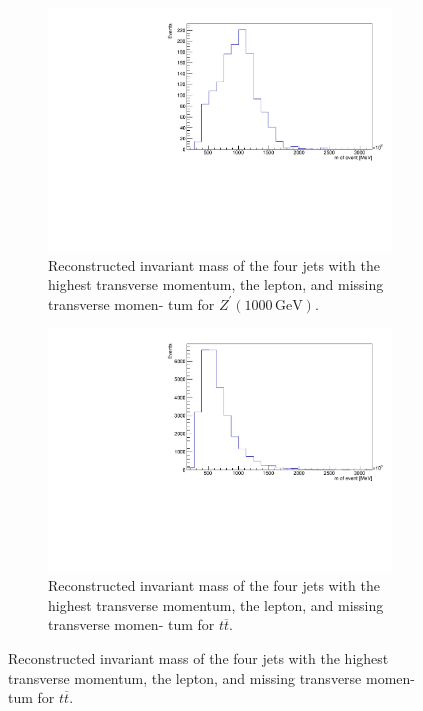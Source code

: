  \begin{figure}[H]
   \begin{subfigure}{0.49\textwidth}%
     \centering%
     \includegraphics[width=\textwidth]{plots/discriminant/zprime1000.el_dis4.pdf}%
     \caption{Reconstructed invariant mass of the four jets with the highest transverse momentum, the lepton, and missing transverse momen- tum for $Z^\prime(1000 \, \si{\giga\eV})$.}%
     \label{fig:5g}%
   \end{subfigure}%
   \hfill
   \begin{subfigure}{0.49\textwidth}%
     \centering%
     \includegraphics[width=\textwidth]{plots/discriminant/ttbar.el_dis4.pdf}%
      \caption{Reconstructed invariant mass of the four jets with the highest transverse momentum, the lepton, and missing transverse momen- tum for $t \overline{t}$.}%

\end{subfigure}
\end{figure}
